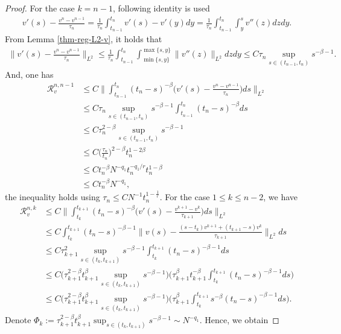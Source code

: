 \documentclass[11pt]{article}
\numberwithin{equation}{section}
\begin{document}
\begin{proof}
For the case $k= n-1$, following identity is used
\begin{align*}
v'(s)-\frac{v^{n}-v^{n-1}}{\tau_{n}}=\frac{1}{\tau_{n}}\int_{t_{n-1}}^{t_{n}}v'(s)-v'(y)dy=\frac{1}{\tau_{n}}\int_{t_{n-1}}^{t_{n}}\int_{y}^sv''(z)dzdy.
\end{align*}
From Lemma \ref{thm-reg-L2-v}, it holds that
\begin{align*}
\bigg\|v'(s)-\frac{v^{n}-v^{n-1}}{\tau_{n}}\bigg\|_{L^2}
\le \frac{1}{\tau_{n}}\int_{t_{n-1}}^{t_{n}}\int_{\min\{s,y\}}^{\max\{s,y\}}\|v''(z)\|_{L^2}dzdy\le C\tau_{n}\sup_{s\in(t_{n-1},t_n)} s^{-\beta-1}.
\end{align*}
And, one has
\begin{align*}
\mathcal{R}_v^{n,n-1}
&\le C\bigg\|\int_{t_{n-1}}^{t_{n}}(t_n-s)^{-\beta}\bigg(v'(s)-\frac{v^{n}-v^{n-1}}{\tau_{n}}\bigg)ds\bigg\|_{L^2}\\
&\le C\tau_{n}\sup_{s\in(t_{n-1},t_n)} s^{-\beta-1}\int_{t_{n-1}}^{t_{n}}(t_n-s)^{-\beta}ds\\
&\le C\tau_n^{2-\beta}\sup_{s\in(t_{n-1},t_n)} s^{-\beta-1}\\
&\le C\bigg(\frac{\tau_n}{t_n}\bigg)^{2-\beta}t_n^{1-2\beta}\\
&\le Ct_n^{-\beta}N^{-q_1}t_n^{-q_1/r}t_n^{1-\beta}\\
&\le Ct_n^{-\beta}N^{-q_1},
\end{align*}
the inequality holds using $\tau_n\leq CN^{-1}t_n^{1-\frac{1}{r}}$.
For the case $1\le k\le n-2$, we have
\begin{align*}
\mathcal{R}_v^{n,k}
&\le C\bigg\|\int_{t_{k}}^{t_{k+1}}(t_n-s)^{-\beta}\bigg(v'(s)-\frac{v^{k+1}-v^{k}}{\tau_{k+1}}\bigg)ds\bigg\|_{L^2}\\
&\le C\int_{t_{k}}^{t_{k+1}}(t_n-s)^{-\beta-1}\bigg\|v(s)-\frac{(s-t_k)v^{k+1}+(t_{k+1}-s)v^{k}}{\tau_{k+1}}\bigg\|_{L^2}ds\\
&\le C\tau_{k+1}^2\sup_{s\in(t_k,t_{k+1})}s^{-\beta-1}\int_{t_{k}}^{t_{k+1}}(t_n-s)^{-\beta-1}ds\\
&\le C\bigg(\tau_{k+1}^{2-\beta}t_{k+1}^\beta\sup_{s\in(t_k,t_{k+1})}s^{-\beta-1}\bigg)\bigg(\tau_{k+1}^\beta t_{k+1}^{-\beta}\int_{t_k}^{t_{k+1}}(t_n-s)^{-\beta-1}ds\bigg)\\
&\le C\bigg(\tau_{k+1}^{2-\beta}t_{k+1}^\beta\sup_{s\in(t_k,t_{k+1})}s^{-\beta-1}\bigg)\bigg(\tau_{k+1}^\beta \int_{t_k}^{t_{k+1}}s^{-\beta}(t_n-s)^{-\beta-1}ds\bigg).
\end{align*}
Denote $\Phi_k:=\tau_{k+1}^{2-\beta}t_{k+1}^\beta\sup_{s\in(t_k,t_{k+1})}s^{-\beta-1}\sim N^{-q_1}$. Hence, we obtain

\end{proof}
\end{document}
